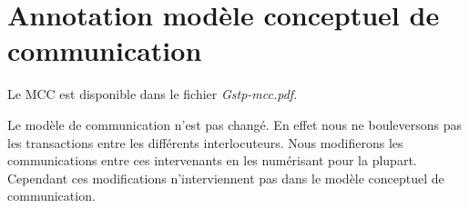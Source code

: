 \section{Annotation modèle conceptuel de communication}

Le MCC est disponible dans le fichier {\sl Gstp-mcc.pdf}.

Le modèle de communication n'est pas changé. En effet nous ne bouleversons pas
les transactions entre les différents interlocuteurs. Nous modifierons les 
communications entre ces intervenants en les numérisant pour la plupart.
Cependant ces modifications n'interviennent pas dans le modèle conceptuel
de communication.
